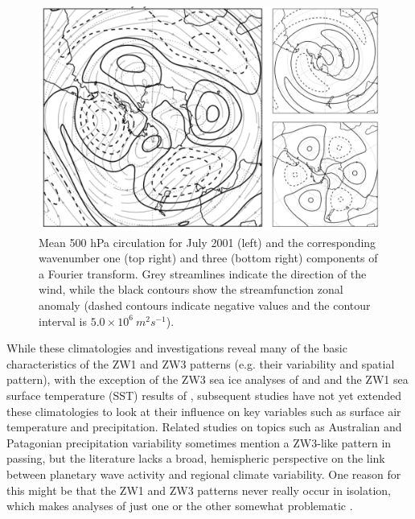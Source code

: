\begin{figure}
\begin{center}
\includegraphics[width=0.7\columnwidth]{figures/zonalwaves/zw_example.png}
\caption[Mean 500 hPa circulation for July 2001 and the corresponding wavenumber one and three components of a Fourier transform]{\label{fig:zw_example}
Mean 500 hPa circulation for July 2001 (left) and the corresponding wavenumber one (top right) and three (bottom right) components of a Fourier transform. Grey streamlines indicate the direction of the wind, while the black contours show the streamfunction zonal anomaly (dashed contours indicate negative values and the contour interval is $5.0 \times 10^6 \: m^2 s^{-1}$).%
}
\end{center}
\end{figure}


While these climatologies and investigations reveal many of the basic characteristics of the ZW1 and ZW3 patterns (e.g. their variability and spatial pattern), with the exception of the ZW3 sea ice analyses of \citet{Raphael2007} and \citet{Yuan2008} and the ZW1 sea surface temperature (SST) results of \citet{Hobbs2007}, subsequent studies have not yet extended these climatologies to look at their influence on key variables such as surface air temperature and precipitation. Related studies on topics such as Australian \citep{Frederiksen2014} and Patagonian \citep{Garreaud2013} precipitation variability sometimes mention a ZW3-like pattern in passing, but the literature lacks a broad, hemispheric perspective on the link between planetary wave activity and regional climate variability. One reason for this might be that the ZW1 and ZW3 patterns never really occur in isolation, which makes analyses of just one or the other somewhat problematic \citep{Hobbs2010}.

